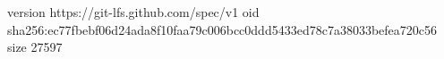 version https://git-lfs.github.com/spec/v1
oid sha256:ec77fbebf06d24ada8f10faa79c006bcc0ddd5433ed78c7a38033befea720c56
size 27597
